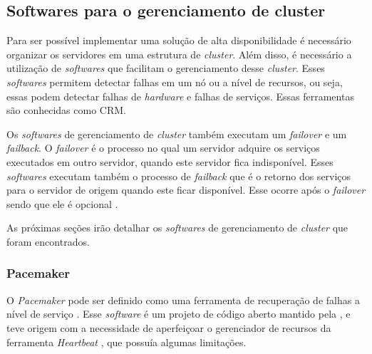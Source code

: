 

\subsection{Softwares para o gerenciamento de cluster}
\label{section:toolcluster}

Para ser possível implementar uma solução de alta disponibilidade é necessário organizar os servidores em uma estrutura de \textit{cluster}.
Além disso, é necessário a utilização de \textit{softwares} que facilitam o gerenciamento desse \textit{cluster}. Esses \textit{softwares} 
permitem detectar falhas em um nó ou a nível de recursos, ou seja, essas podem detectar falhas de \textit{hardware} e falhas de serviços. 
Essas ferramentas são conhecidas como \ac{CRM}. 

Os \textit{softwares} de gerenciamento de \textit{cluster} também executam um \textit{failover} e um \textit{failback}. O \textit{failover} é o 
processo no qual um servidor adquire os serviços executados em outro servidor, quando este servidor fica indisponível. Esses \textit{softwares} 
executam também o processo de \textit{failback} que é o retorno dos serviços para o servidor de origem quando este ficar disponível. Esse ocorre 
após o \textit{failover} sendo que ele é opcional \cite{bassan2008}.

As próximas seções irão detalhar os \textit{softwares} de gerenciamento de \textit{cluster} que foram encontrados.

\subsubsection{Pacemaker}
\label{section:pacemaker}
O \textit{Pacemaker} \cite{pacemaker} pode ser definido como uma ferramenta de recuperação de falhas a nível de serviço \cite{perkov2011}. 
Esse \textit{software} é um projeto de código aberto mantido pela \cite{clusterlabs}, e teve origem com a necessidade de aperfeiçoar o gerenciador 
de recursos da ferramenta \textit{Heartbeat} \cite{heartbeat}, que possuía algumas limitações. 

